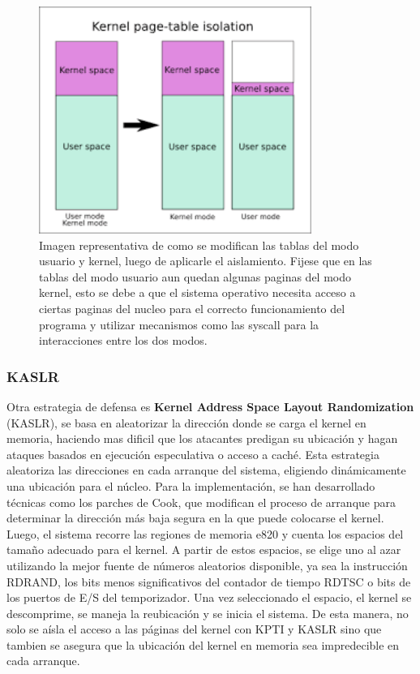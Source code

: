 \documentclass[lettersize,compsoc]{IEEEtran}
\begin{document}
\begin{figure}[h]
  \centering
  \includegraphics[width=3.5in]{isolation-page.png}
  \caption{\small Imagen representativa de como se modifican las tablas del modo usuario y kernel, luego de aplicarle el aislamiento.
  \newline
  Fijese que en las tablas del modo usuario aun quedan algunas paginas del modo kernel, esto se debe a que el sistema operativo necesita acceso a ciertas paginas del nucleo para el correcto funcionamiento del programa y utilizar mecanismos como las syscall para la interacciones entre los dos modos.}
\end{figure}

\subsubsection{\textbf{KASLR}}
\noindent Otra estrategia de defensa es \textbf{Kernel Address Space Layout Randomization}\cite{KASLR} (KASLR), se basa en aleatorizar la dirección donde se carga el kernel en memoria, haciendo mas dificil que los atacantes predigan su ubicación y hagan ataques basados en ejecución especulativa o acceso a caché.   Esta estrategia aleatoriza las direcciones en cada arranque del sistema, eligiendo dinámicamente una ubicación para el núcleo.
\noindent                                           %
\noindent Para la implementación, se han desarrollado técnicas como los parches de Cook, que modifican el proceso de arranque para determinar la dirección más baja segura en la que puede colocarse el kernel. Luego, el sistema recorre las regiones de memoria e820 y cuenta los espacios del tamaño adecuado para el kernel. A partir de estos espacios, se elige uno al azar utilizando la mejor fuente de números aleatorios disponible, ya sea la instrucción RDRAND, los bits menos significativos del contador de tiempo RDTSC o bits de los puertos de E/S del temporizador. Una vez seleccionado el espacio, el kernel se descomprime, se maneja la reubicación y se inicia el sistema.
\noindent
\noindent De esta manera, no solo se aísla el acceso a las páginas del kernel con KPTI y KASLR sino que tambien se asegura que la ubicación del kernel en memoria sea impredecible en cada arranque. 
\end{document}
